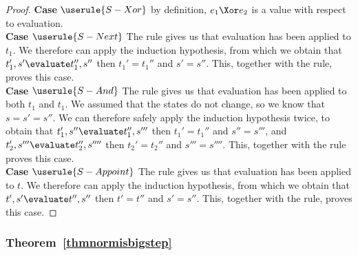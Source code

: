 \begin{proof}
  \noindent\textbf{Case} $\userule{S-Xor}$ by definition, $e_1\Xor e_2$ is a value with respect to evaluation.\\
  \noindent\textbf{Case} $\userule{S-Next}$ The  rule gives us that evaluation has been applied to $t_1$. We therefore can apply the induction hypothesis, from which we obtain that $t_1',s'\evaluate t_1'',s''$ then $t_1'=t_1''$ and $s'=s''$. This, together with the  rule, proves this case.\\
  \noindent\textbf{Case} $\userule{S-And}$ The  rule gives us that evaluation has been applied to both $t_1$ and $t_1$. We assumed that the states do not change, so we know that $s=s'=s''$. We can therefore safely apply the induction hypothesis twice, to obtain that $t_1',s''\evaluate t_1'',s'''$ then $t_1'=t_1''$ and $s''=s'''$, and $t_2',s'''\evaluate t_2'',s''''$ then $t_2'=t_2''$ and $s'''=s''''$. This, together with the  rule proves this case.\\
  \noindent\textbf{Case} $\userule{S-Appoint}$ The  rule gives us that evaluation has been applied to $t$. We therefore can apply the induction hypothesis, from which we obtain that $t',s'\evaluate t'',s''$ then $t'=t''$ and $s'=s''$. This, together with the  rule, proves this case.

\end{proof}

\subsubsection{Theorem~\ref{thmnormisbigstep}}


